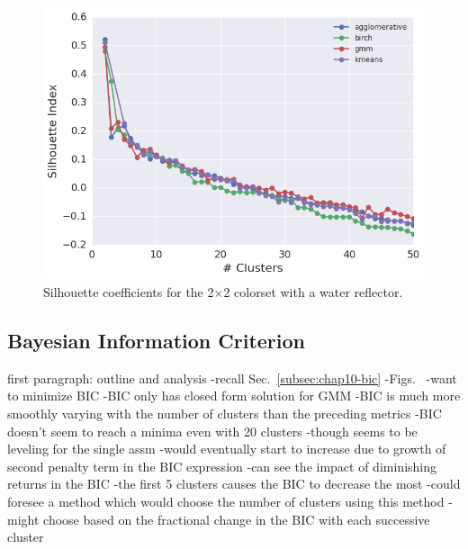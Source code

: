 \begin{figure}[h!]
\centering
\includegraphics[width=0.87\linewidth]{figures/results/model-select/reflector/silhouette-combined-U238-nu-fission-1}
\vspace{2mm}
\caption[Silhouette coefficients for the 2$\times$2 colorset with reflector]{Silhouette coefficients for the 2$\times$2 colorset with a water reflector.}
\label{fig:chap11-refl-silhouette-coeff}
\end{figure}

\subsection{Bayesian Information Criterion}
\label{subsec:chap11-bic}

first paragraph: outline and analysis
-recall Sec.~\ref{subsec:chap10-bic}
-Figs.~
-want to minimize BIC
-BIC only has closed form solution for \ac{GMM}
-BIC is much more smoothly varying with the number of clusters than the preceding metrics
-BIC doesn't seem to reach a minima even with 20 clusters
  -though seems to be leveling for the single assm
  -would eventually start to increase due to growth of second penalty term in the BIC expression
-can see the impact of diminishing returns in the BIC
  -the first 5 clusters causes the BIC to decrease the most
-could foresee a method which would choose the number of clusters using this method
  -might choose based on the fractional change in the BIC with each successive cluster

